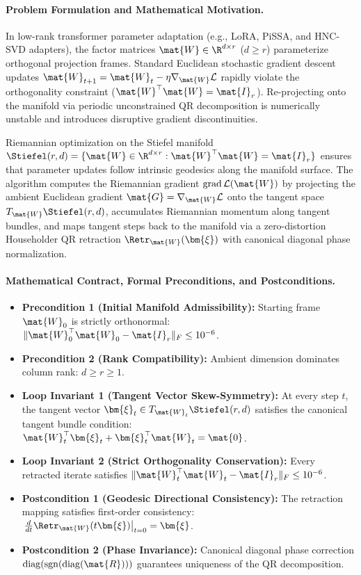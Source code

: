 \paragraph{Problem Formulation and Mathematical Motivation.}
In low-rank transformer parameter adaptation (e.g., LoRA, PiSSA, and HNC-SVD adapters), the factor matrices $\mat{W} \in \R^{d \times r}$ ($d \ge r$) parameterize orthogonal projection frames. Standard Euclidean stochastic gradient descent updates $\mat{W}_{t+1} = \mat{W}_t - \eta \nabla_{\mat{W}} \mathcal{L}$ rapidly violate the orthogonality constraint ($\mat{W}^\top \mat{W} = \mat{I}_r$). Re-projecting onto the manifold via periodic unconstrained QR decomposition is numerically unstable and introduces disruptive gradient discontinuities.

Riemannian optimization on the Stiefel manifold $\Stiefel(r, d) = \{\mat{W} \in \R^{d \times r} : \mat{W}^\top \mat{W} = \mat{I}_r\}$ ensures that parameter updates follow intrinsic geodesics along the manifold surface. The algorithm computes the Riemannian gradient $\operatorname{grad}\mathcal{L}(\mat{W})$ by projecting the ambient Euclidean gradient $\mat{G} = \nabla_{\mat{W}}\mathcal{L}$ onto the tangent space $T_{\mat{W}}\Stiefel(r, d)$, accumulates Riemannian momentum along tangent bundles, and maps tangent steps back to the manifold via a zero-distortion Householder QR retraction $\Retr_{\mat{W}}(\bm{\xi})$ with canonical diagonal phase normalization.

\paragraph{Mathematical Contract, Formal Preconditions, and Postconditions.}
\begin{itemize}
    \item \textbf{Precondition 1 (Initial Manifold Admissibility):} Starting frame $\mat{W}_0$ is strictly orthonormal: $\|\mat{W}_0^\top \mat{W}_0 - \mat{I}_r\|_F \le 10^{-6}$.
    \item \textbf{Precondition 2 (Rank Compatibility):} Ambient dimension dominates column rank: $d \ge r \ge 1$.
    \item \textbf{Loop Invariant 1 (Tangent Vector Skew-Symmetry):} At every step $t$, the tangent vector $\bm{\xi}_t \in T_{\mat{W}_t}\Stiefel(r, d)$ satisfies the canonical tangent bundle condition: $\mat{W}_t^\top \bm{\xi}_t + \bm{\xi}_t^\top \mat{W}_t = \mat{0}$.
    \item \textbf{Loop Invariant 2 (Strict Orthogonality Conservation):} Every retracted iterate satisfies $\|\mat{W}_t^\top \mat{W}_t - \mat{I}_r\|_F \le 10^{-6}$.
    \item \textbf{Postcondition 1 (Geodesic Directional Consistency):} The retraction mapping satisfies first-order consistency: $\left.\frac{d}{dt} \Retr_{\mat{W}}(t \bm{\xi})\right|_{t=0} = \bm{\xi}$.
    \item \textbf{Postcondition 2 (Phase Invariance):} Canonical diagonal phase correction $\operatorname{diag}(\operatorname{sgn}(\operatorname{diag}(\mat{R})))$ guarantees uniqueness of the QR decomposition.
\end{itemize}

